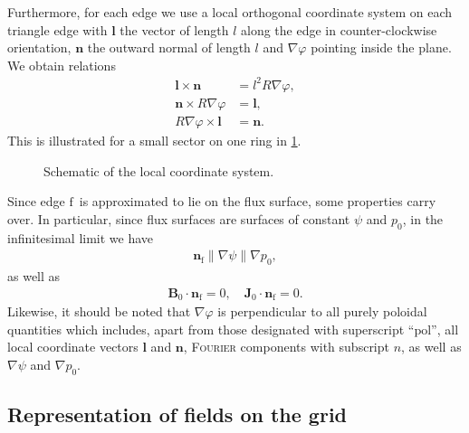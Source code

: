 \documentclass[a4paper, twoside, 10pt, english]{article}
\numberwithin{equation}{section}
\let\temp\varrho
\let\varrho\rho
\let\rho\temp
\let\temp\vartheta
\let\vartheta\theta
\let\theta\temp
\let\temp\varphi
\let\varphi\phi
\let\phi\temp
\let\vec\symbf
\newcommand*\grad{\ensuremath{\nabla}}
\newcommand*\pol{\ensuremath{\textrm{pol}}}  %
\newcommand*\fs{\ensuremath{\textrm{f}}}  %
\begin{document}
Furthermore, for each edge we use a local orthogonal coordinate system on each triangle edge with $\vec{l}$ the vector of length $l$ along the edge in counter-clockwise orientation, $\vec{n}$ the outward normal of length $l$ and $\grad \phi$ pointing inside the plane. We obtain relations
\begin{align}
  \vec{l} \times \vec{n} &= l^{2} R \grad \phi, \label{eq:edge_phi} \\
  \vec{n} \times R \grad \phi &= \vec{l}, \label{eq:edge_l} \\
  R \grad \phi \times \vec{l} &= \vec{n}. \label{eq:edge_n}
\end{align}
This is illustrated for a small sector on one ring in \cref{fig:local_coordinates}.
\begin{figure}[bth]
  \centering
  
  \caption{Schematic of the local coordinate system.}
  \label{fig:local_coordinates}
\end{figure}

Since edge \fs\ is approximated to lie on the flux surface, some properties carry over. In particular, since flux surfaces are surfaces of constant $\psi$ and $p_{0}$, in the infinitesimal limit we have
\begin{gather}
  \vec{n}_{\fs} \parallel \grad \psi \parallel \grad p_{0},
\end{gather}
as well as
\begin{gather}
  \vec{B}_{0} \cdot \vec{n}_{\fs} = 0, \quad \vec{J}_{0} \cdot \vec{n}_{\fs} = 0.
\end{gather}
Likewise, it should be noted that $\nabla \phi$ is perpendicular to all purely poloidal quantities which includes, apart from those designated with superscript \enquote{\pol}, all local coordinate vectors $\vec{l}$ and $\vec{n}$, \textsc{Fourier} components with subscript $n$, as well as $\grad \psi$ and $\grad p_{0}$.

\subsection{Representation of fields on the grid}
\label{sec:dofs}
\end{document}
